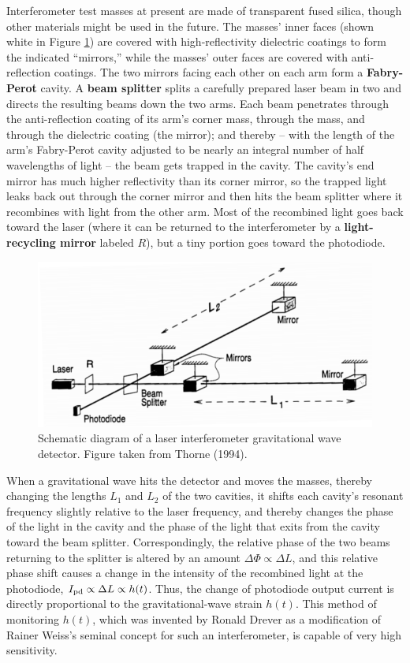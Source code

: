 \documentclass[a4paper,10pt]{article}
\begin{document}
{\noindent}Interferometer test masses at present are made of transparent fused silica, though other materials might be used in the future. The masses' inner faces (shown white in Figure \ref{fig:interferometer}) are covered with high-reflectivity dielectric coatings to form the indicated ``mirrors,'' while the masses' outer faces are covered with anti-reflection coatings. The two mirrors facing each other on each arm form a \textbf{Fabry-Perot} cavity. A \textbf{beam splitter} splits a carefully prepared laser beam in two and directs the resulting beams down the two arms. Each beam penetrates through the anti-reflection coating of its arm's corner mass, through the mass, and through the dielectric coating (the mirror); and thereby -- with the length of the arm's Fabry-Perot cavity adjusted to be nearly an integral number of half wavelengths of light -- the beam gets trapped in the cavity. The cavity's end mirror has much higher reflectivity than its corner mirror, so the trapped light leaks back out
through the corner mirror and then hits the beam splitter where it recombines with light from the other arm. Most of the recombined light goes back toward the laser (where it can be returned to the interferometer by a \textbf{light-recycling mirror}
labeled $R$), but a tiny portion goes toward the photodiode.

\begin{figure}[t]
    \centering
    \includegraphics[width=12cm]{figures/interferometer.png}
    \caption{\footnotesize{Schematic diagram of a laser interferometer gravitational wave detector. Figure taken from Thorne (1994).}}
    \label{fig:interferometer}
\end{figure}

{\noindent}When a gravitational wave hits the detector and moves the masses, thereby changing the lengths $L_1$ and $L_2$ of the two cavities, it shifts each cavity's resonant frequency slightly relative to the laser frequency, and thereby changes the phase of the light in the cavity and the phase of the light that exits from the cavity toward the beam splitter. Correspondingly, the relative phase of the two beams returning to the splitter is altered by an amount $\Delta\Phi\propto\Delta L$, and this relative phase shift causes a change in the intensity of the recombined light at the photodiode, $I_{\rm pd}\propto\Delta L\propto h(t)$. Thus, the change of photodiode output current is directly proportional to the gravitational-wave strain $h(t)$. This method of monitoring $h(t)$, which was invented by Ronald Drever as a modification of Rainer Weiss's seminal concept for such an interferometer, is capable of very high sensitivity.
\end{document}
